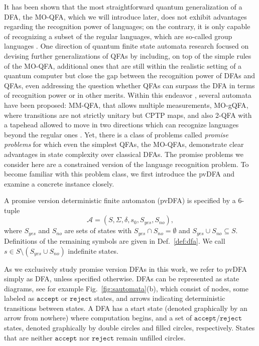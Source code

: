 \documentclass[../main.tex]{subfiles}
\begin{document}
It has been shown that the most straightforward quantum generalization of a \ac{DFA}, the \ac{MO-QFA}, which we will introduce later, does not exhibit advantages regarding the recognition power of languages; on the contrary, it is only capable of recognizing a subset of the regular languages, which are so-called group languages \cite{brodsky1999characterizations}. One direction of quantum finite state automata research focused on devising further generalizations of \acp{QFA} by including, on top of the simple rules of the \ac{MO-QFA}, additional ones that are still within the realistic setting of a quantum computer but close the gap between the recognition power of \acp{DFA} and \acp{QFA}, even addressing the question whether \acp{QFA} can surpass the \ac{DFA} in terms of recognition power or in other merits. Within this endeavor \cite{ambainis2006algebraic,brodsky1999characterizations, li2009characterizations,}, several automata have been proposed: \ac{MM-QFA}, that allows multiple measurements, \ac{MO-gQFA}, where transitions are not strictly unitary but \ac{CPTP} maps, and also \ac{2-QFA} with a tapehead allowed to move in two directions which can recognize languages beyond the regular ones \cite{li2009characterizations}. Yet, there is a class of problems called \textit{promise problems} for which even the simplest \acp{QFA}, the \acp{MO-QFA}, demonstrate clear advantages in state complexity over classical \acp{DFA}. The promise problems we consider here are a constrained version of the language recognition problem. To become familiar with this problem class, we first introduce the \ac{pvDFA} and examine a concrete instance closely. 
\begin{definition}
    A promise version deterministic finite automaton (pvDFA) is specified by a 6-tuple 
    \begin{equation}
        \mathcal{A} = (S, \Sigma, \delta, s_0, S_{yes}, S_{no}),
    \end{equation} where $S_{yes}$ and  $S_{no}$ are sets of states with $S_{yes} \cap S_{no} = \emptyset$ and $S_{yes} \cup S_{no} \subseteq S$. Definitions of the remaining symbols are given in Def.~\ref{def:dfa}. We call $s \in S \setminus (S_{yes}\cup S_{no})$ indefinite states.
\end{definition}
As we exclusively study promise version DFAs in this work, we refer to \ac{pvDFA} simply as \ac{DFA}, unless specified otherwise.
\acp{DFA} can be represented as state diagrams, see for example Fig.~\ref{fig:sautomata}(b), which consist of nodes, some labeled as $\mathtt{accept}$ or $\mathtt{reject}$  states, and arrows indicating deterministic transitions between states. A \ac{DFA} has a start state (denoted graphically by an arrow from nowhere) where computation begins, and a set of $\mathtt{accept}$/$\mathtt{reject}$  states, denoted graphically by double circles and filled circles, respectively. States that are neither $\mathtt{accept}$ nor $\mathtt{reject}$  remain unfilled circles.
\end{document}
